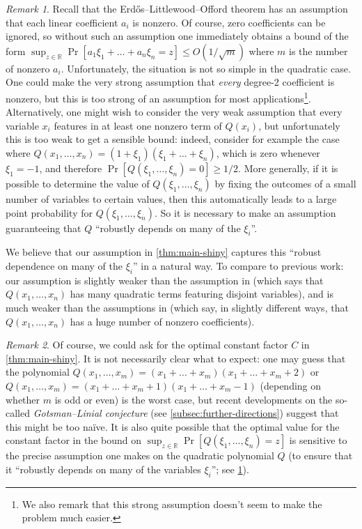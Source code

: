 \documentclass[english]{article}
\theoremstyle{remark}
\newtheorem{remark}{Remark}[section]
\numberwithin{equation}{section}
\numberwithin{figure}{section}
\newcommand{\RR}{\mathbb{R}}
\newcommand{\mb}{\mathbb}
\begin{document}
\begin{remark}\label{rem:nondegeneracy-conditions}
Recall that the Erd\H os--Littlewood--Offord theorem has an assumption
that each linear coefficient $a_i$ is nonzero. Of course, zero
coefficients can be ignored,
so without such an assumption one immediately
obtains a bound of the form $\sup_{z\in \mb R}\Pr[a_1\xi_1+\dots+a_n\xi_n=z]\le O(1/\sqrt{m})$ where $m$ is the number
of nonzero $a_{i}$.
Unfortunately, the situation is not so simple
in the quadratic case. One could make the very strong assumption that
\emph{every} degree-2 coefficient is nonzero, but this is too strong
of an assumption for most applications\footnote{We also remark that this strong assumption doesn't seem to make the problem much easier.}. Alternatively, one might wish
to consider the very weak assumption that every variable $x_{i}$
features in at least one nonzero term of $Q(x_{i})$, but unfortunately
this is too weak to get a sensible bound: indeed, consider for example the
case where $Q(x_{1},\dots,x_{n})=(1+\xi_{1})(\xi_{1}+\dots+\xi_{n})$,
which is zero whenever $\xi_{1}=-1$, and therefore $\Pr[Q(\xi_{1},\dots,\xi_{n})=0]\ge 1/2$. 
More generally, if it is possible to determine the value of $Q(\xi_{1},\dots,\xi_{n})$ by fixing the outcomes of a small number of variables to certain values, then this automatically leads to a large point probability for $Q(\xi_{1},\dots,\xi_{n})$. So it is necessary to make an assumption guaranteeing that $Q$ ``robustly depends on many of the $\xi_{i}$''.

We believe that our assumption in \cref{thm:main-shiny} captures this ``robust dependence on many of the $\xi_{i}$'' in a natural way.
To compare to previous work: our assumption is slightly weaker than
the assumption in \cite{MNV16} (which says that $Q(x_{1},\dots,x_{n})$ has many
quadratic terms featuring disjoint variables), and is much weaker
than the assumptions in \cite{Cos13,CTV06} (which say, in slightly different ways, that $Q(x_{1},\dots,x_{n})$ has a huge number of nonzero coefficients).
\end{remark}
\vspace{1pt}

\begin{remark}
Of course, we could ask for the optimal constant factor $C$ in \cref{thm:main-shiny}. It is not necessarily clear what to expect: one may guess that the polynomial $Q(x_1,\dots,x_m)=(x_1+\dots+x_m)(x_1+\dots+x_m+2)$ or $Q(x_1,\dots,x_m)=(x_1+\dots+x_m+1)(x_1+\dots+x_m-1)$ (depending on whether $m$ is odd or even) is the worst case, but recent developments on the so-called \emph{Gotsman--Linial conjecture} (see \cref{subsec:further-directions}) suggest that this might be too na\"ive. It is also quite possible that the optimal value for the constant factor in the bound on $\sup_{z\in\RR}\Pr[Q(\xi_{1},\dots,\xi_{n})=z]$ is sensitive to the precise assumption one makes on the quadratic polynomial $Q$ (to ensure that it ``robustly depends on many of the variables $\xi_i$''; see \cref{rem:nondegeneracy-conditions}).
\end{remark}
\end{document}
